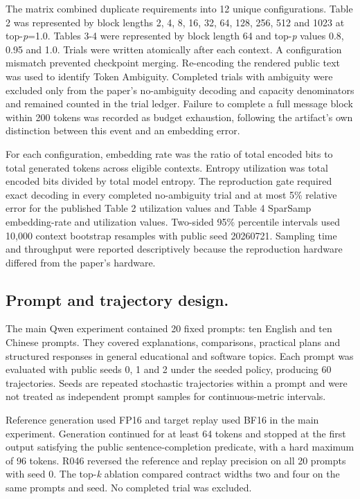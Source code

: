 \documentclass{nature}
\begin{document}
\begin{methods}
The matrix combined duplicate requirements into 12 unique configurations. Table 2 was represented by block lengths 2, 4, 8, 16, 32, 64, 128, 256, 512 and 1023 at top-\textit{p}=1.0. Tables 3-4 were represented by block length 64 and top-\textit{p} values 0.8, 0.95 and 1.0. Trials were written atomically after each context. A configuration mismatch prevented checkpoint merging. Re-encoding the rendered public text was used to identify Token Ambiguity. Completed trials with ambiguity were excluded only from the paper's no-ambiguity decoding and capacity denominators and remained counted in the trial ledger. Failure to complete a full message block within 200 tokens was recorded as budget exhaustion, following the artifact's own distinction between this event and an embedding error.

For each configuration, embedding rate was the ratio of total encoded bits to total generated tokens across eligible contexts. Entropy utilization was total encoded bits divided by total model entropy. The reproduction gate required exact decoding in every completed no-ambiguity trial and at most 5\% relative error for the published Table 2 utilization values and Table 4 SparSamp embedding-rate and utilization values. Two-sided 95\% percentile intervals used 10,000 context bootstrap resamples with public seed 20260721. Sampling time and throughput were reported descriptively because the reproduction hardware differed from the paper's hardware.

\subsection{Prompt and trajectory design.}
The main Qwen experiment contained 20 fixed prompts: ten English and ten Chinese prompts. They covered explanations, comparisons, practical plans and structured responses in general educational and software topics. Each prompt was evaluated with public seeds 0, 1 and 2 under the seeded policy, producing 60 trajectories. Seeds are repeated stochastic trajectories within a prompt and were not treated as independent prompt samples for continuous-metric intervals.

Reference generation used FP16 and target replay used BF16 in the main experiment. Generation continued for at least 64 tokens and stopped at the first output satisfying the public sentence-completion predicate, with a hard maximum of 96 tokens. R046 reversed the reference and replay precision on all 20 prompts with seed 0. The top-\textit{k} ablation compared contract widths two and four on the same prompts and seed. No completed trial was excluded.


\end{methods}
\end{document}
